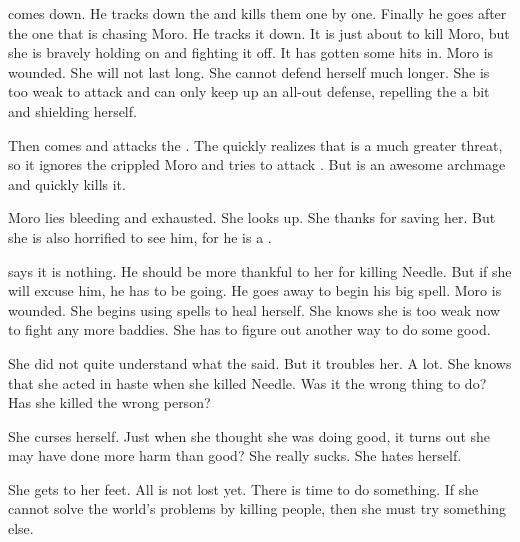 \Psyrex comes down.
He tracks down the \banes and kills them one by one.
Finally he goes after the one that is chasing Moro.
He tracks it down.
It is just about to kill Moro, but she is bravely holding on and fighting it off.
It has gotten some hits in.
Moro is wounded.
She will not last long. 
She cannot defend herself much longer. 
She is too weak to attack and can only keep up an all-out defense, repelling the \bane a bit and shielding herself. 

Then \Psyrex comes and attacks the \bane. 
The \bane quickly realizes that \Psyrex is a much greater threat, so it ignores the crippled Moro and tries to attack \Psyrex. 
But \Psyrex is an awesome archmage and quickly kills it. 

Moro lies bleeding and exhausted. 
She looks up. 
She thanks \Psyrex for saving her. 
But she is also horrified to see him, for he is a \serpentman. 

\Psyrex says it is nothing. 
He should be more thankful to her for killing Needle. 
But if she will excuse him, he has to be going.
He goes away to begin his big spell. 
Moro is wounded. 
She begins using spells to heal herself. 
She knows she is too weak now to fight any more baddies. 
She has to figure out another way to do some good. 

She did not quite understand what the \serpentman said. 
But it troubles her.
A lot. 
She knows that she acted in haste when she killed Needle. 
Was it the wrong thing to do?
Has she killed the wrong person?

She curses herself.
Just when she thought she was doing good, it turns out she may have done more harm than good?
She really sucks. 
She hates herself. 

She gets to her feet.
All is not lost yet.
There is time to do something.
If she cannot solve the world's problems by killing people, then she must try something else. 





